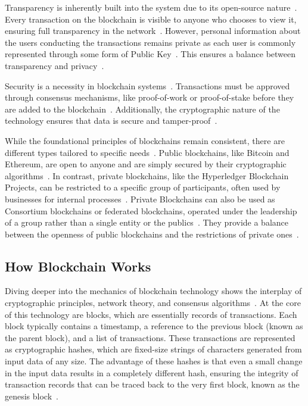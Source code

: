 Transparency is inherently built into the system due to its open-source nature~\cite{Banupriya.2021}. Every transaction on the blockchain is visible to anyone who chooses to view it, ensuring full transparency in the network~\cite{Banupriya.2021}. However, personal information about the users conducting the transactions remains private as each user is commonly represented through some form of Public Key~\cite{Wei.2022}. This ensures a balance between transparency and privacy~\cite{Wei.2022}.

Security is a necessity in blockchain systems~\cite{Nguyen.2019}. Transactions must be approved through consensus mechanisms, like proof-of-work or proof-of-stake before they are added to the blockchain~\cite{Nguyen.2019}. Additionally, the cryptographic nature of the technology ensures that data is secure and tamper-proof~\cite{Akbar.2021}.

While the foundational principles of blockchains remain consistent, there are different types tailored to specific needs~\cite{Ghosh.2021}. Public blockchains, like Bitcoin and Ethereum, are open to anyone and are simply secured by their cryptographic algorithms~\cite{Ghosh.2021}. In contrast, private blockchains, like the Hyperledger Blockchain Projects, can be restricted to a specific group of participants, often used by businesses for internal processes~\cite{Lu.2023}. Private Blockchains can also be used as Consortium blockchains or federated blockchains, operated under the leadership of a group rather than a single entity or the publics~\cite{Lu.2023}. They provide a balance between the openness of public blockchains and the restrictions of private ones~\cite{Lu.2023}.

\subsection{How Blockchain Works}
Diving deeper into the mechanics of blockchain technology shows the interplay of cryptographic principles, network theory, and consensus algorithms~\cite{Xiong.2022}. At the core of this technology are blocks, which are essentially records of transactions. Each block typically contains a timestamp, a reference to the previous block (known as the parent block), and a list of transactions. These transactions are represented as cryptographic hashes, which are fixed-size strings of characters generated from input data of any size. The advantage of these hashes is that even a small change in the input data results in a completely different hash, ensuring the integrity of transaction records that can be traced back to the very first block, known as the genesis block~\cite{Xiong.2022}.

